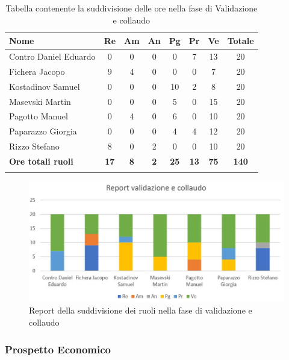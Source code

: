 \documentclass[../piano_di_progetto.tex]{subfiles}
\begin{document}
\begin{center}
	\begin{longtable}{|l|c|c|c|c|c|c|c|}
		\hline
		\rowcolor{lightgray}
		\textbf{Nome} & \textbf{Re} & \textbf{Am} & \textbf{An} & \textbf{Pg}  & \textbf{Pr}   & \textbf{Ve} & \textbf{Totale} \\

		\hline
			Contro Daniel Eduardo & 0 & 0 & 0 & 0 & 7 & 13 & 20\\
			Fichera Jacopo & 9 & 4 & 0 & 0 & 0 & 7 & 20 \\ 
			Kostadinov Samuel & 0 & 0 & 0 & 10 & 2 & 8 & 20 \\ 		
			Masevski Martin & 0 & 0 & 0 & 5 & 0 & 15 & 20 \\
			Pagotto Manuel & 0 & 4 & 0 & 6 & 0 & 10 & 20 \\			
			Paparazzo Giorgia & 0 & 0 & 0 & 4 & 4 & 12 & 20 \\
			Rizzo Stefano & 8 & 0 & 2 & 0 & 0 & 10 & 20 \\
			\hline
			\textbf{Ore totali ruoli} & \textbf{17} & \textbf{8} & \textbf{2} & \textbf{25} & \textbf{13} & \textbf{75} & \textbf{140} \\
			\hline
		\rowcolor{white}
		\caption{Tabella contenente la suddivisione delle ore nella fase di Validazione e collaudo}
	\end{longtable}
\end{center}

\begin{figure}[H]
\centering
\includegraphics[width=12cm]{src/img/report/report_valid_collaudo}
\caption{Report della suddivisione dei ruoli nella fase di validazione e collaudo}
\end{figure}

\subsubsection{Prospetto Economico}
\end{document}
